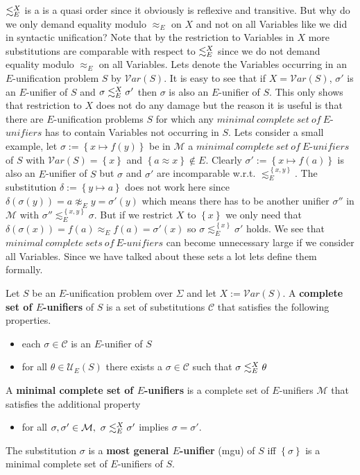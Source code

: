 $\lesssim^X_E$ is a is a quasi order since it obviously is reflexive and transitive. But why do we only demand equality modulo $\approx_E$ on $X$ and not on all Variables like we did in syntactic unification? Note that by the restriction to Variables in $X$ more substitutions are comparable with respect to $\lesssim^X_E$ since we do not demand equality modulo $\approx_E$ on all Variables. Lets denote the Variables occurring in an $E$-unification problem $S$ by $\mathcal{V}ar(S)$. It is easy to see that if $X=\mathcal{V}ar(S)$, $\sigma'$ is an $E$-unifier of $S$ and $\sigma\lesssim^X_E\sigma'$ then $\sigma$ is also an $E$-unifier of $S$. This only shows that restriction to $X$ does not do any damage but the reason it is useful is that there are $E$-unification problems $S$ for which any $minimal\ complete\ set\ of\ E$-$unifiers$ has to contain Variables not occurring in $S$. Lets consider a small example, let $\sigma:=\left\lbrace x\mapsto f(y)\right\rbrace$ be in $\mathcal{M}$ a $minimal\ complete\ set\ of\ E$-$unifiers$ of $S$ with $\mathcal{V}ar(S)=\left\lbrace x\right\rbrace$ and $\left\lbrace a\approx x\right\rbrace \notin E$. Clearly $\sigma':=\left\lbrace x\mapsto f(a)\right\rbrace$ is also an $E$-unifier of $S$ but $\sigma$ and $\sigma'$ are incomparable w.r.t. $\lesssim^{\left\lbrace x,y\right\rbrace }_E$. The substitution $\delta:=\left\lbrace y\mapsto a\right\rbrace $ does not work here since $\delta(\sigma(y))=a \not\approx_E y=\sigma'(y)$ which means there has to be another unifier $\sigma''$ in $\mathcal{M}$ with $\sigma''\lesssim^{\left\lbrace x,y\right\rbrace }_E\sigma$. But if we restrict $X$ to $\left\lbrace x\right\rbrace $ we only need that $\delta(\sigma(x))=f(a) \approx_E f(a)=\sigma'(x)$ so $\sigma\lesssim^{\left\lbrace x\right\rbrace }_E\sigma'$ holds. We see that $minimal\ complete\ sets\ of\ E$-$unifiers$ can become unnecessary large if we consider all Variables. Since we have talked about these sets a lot lets define them formally.
\begin{definition}
Let $S$ be an $E$-unification problem over $\Sigma$ and let $X:=\mathcal{V}ar(S)$. A \textbf{complete set of $E$-unifiers} of $S$ is a set of substitutions $\mathcal{C}$ that satisfies the following properties.
\begin{itemize}
\item each $\sigma \in \mathcal{C}$ is an $E$-unifier of $S$
\item for all $\theta \in\mathcal{U}_E(S)$ there exists a $\sigma \in \mathcal{C}$ such that $\sigma\lesssim^X_E\theta$
\end{itemize}
A \textbf{minimal complete set of $E$-unifiers} is a complete set of $E$-unifiers $\mathcal{M}$ that satisfies the additional property
\begin{itemize}
\item for all $\sigma,\sigma'\in\mathcal{M},\ \sigma\moreGeneral\sigma'$ implies $\sigma=\sigma'$.
\end{itemize}
The substitution $\sigma$ is a \textbf{most general $E$-unifier} (mgu) of $S$ iff $\left\lbrace \sigma\right\rbrace$ is a minimal complete set of $E$-unifiers of $S$.
\end{definition}

